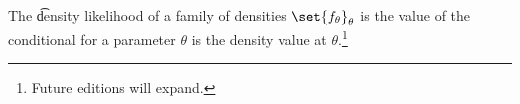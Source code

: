 


The \t{density likelihood} of a family of densities $\set{f_{\theta}}_{\theta}$ is the value of the conditional for a parameter $\theta$ is the density value at $\theta$.\footnote{Future editions will expand.}


\blankpage
